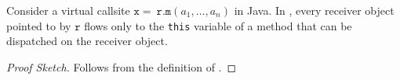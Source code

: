 \begin{lem}
\label{theorem:handlingReceiver}
Consider a virtual callsite $\mathtt{x = } ~ \mathtt{r}.\mathtt{m}(a_1, \dots, a_n)$ in Java. 
In \LF,
every receiver object pointed to by $\mathtt{r}$  flows only to the \texttt{this} variable of a method that can be dispatched on the receiver object.
\end{lem}
\begin{proof}[Proof Sketch]
Follows from the definition of \LF.
\end{proof}




